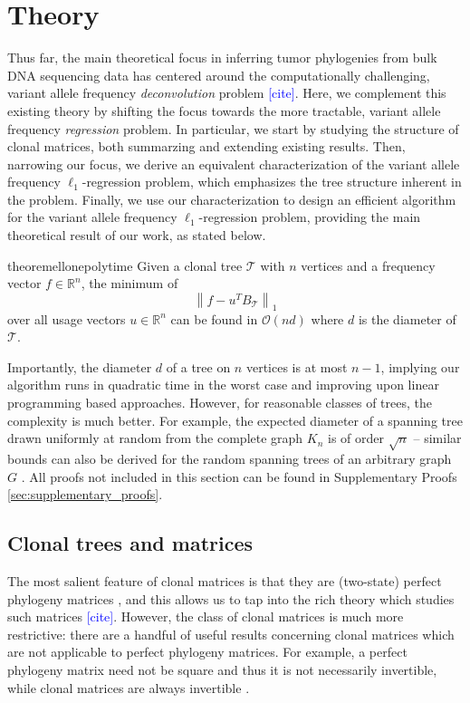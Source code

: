 \documentclass[10pt]{article}
\newcommand{\henri}[1]{\textcolor{blue}{[#1]}}
\newcommand{\tree}{\mathcal{T}}
\begin{document}
\section{Theory}
\label{sec:theory}
Thus far, the main theoretical focus in inferring tumor phylogenies from bulk DNA sequencing data 
has centered around the computationally challenging, variant allele frequency \emph{deconvolution} 
problem \henri{cite}. Here, we complement this existing theory by shifting the focus 
towards the more tractable, variant allele frequency \emph{regression} problem. In 
particular, we start by studying the structure of clonal matrices, both summarzing 
and extending existing results. Then, narrowing our focus, we derive an equivalent
characterization of the variant allele frequency $\ell_1$-regression problem, which 
emphasizes the tree structure inherent in the problem. Finally, we use our
characterization to design an efficient algorithm for the variant allele 
frequency $\ell_1$-regression problem, providing the main theoretical result of 
our work, as stated below. 
\begin{restatable}{theorem}{ellonepolytime}
    \label{thm:ellonepolytime}
    Given a clonal tree $\tree$ with $n$ vertices and a frequency vector $f \in \mathbb{R}^n$, the
    minimum of 
    \[\left\lVert f - u^T B_{\tree}\right\rVert_1 \]
    over all usage vectors $u \in \mathbb{R}^n$ can be found in $\mathcal{O}(nd)$ where $d$ is 
    the diameter of $\tree$.
\end{restatable}

Importantly, the diameter $d$ of a tree on $n$ vertices is at most $n - 1$, implying our algorithm 
runs in quadratic time in the worst case and improving upon linear programming based approaches. 
However, for reasonable classes of trees, the complexity is much better. For example, the expected
diameter of a spanning tree drawn uniformly at random from the complete graph $K_n$ is 
of order $\sqrt{n}$ -- similar bounds can also be derived 
for the random spanning trees of an arbitrary graph $G$ \cite{renyi_height_1967, chung_diameter_2012}.
All proofs not included in this section can be found in
Supplementary Proofs \ref{sec:supplementary_proofs}.


\subsection{Clonal trees and matrices}
\label{sec:clonal-trees-matrices}

The most salient feature of clonal matrices is that they are (two-state) perfect phylogeny matrices 
\cite{el-kebir_reconstruction_2015}, and this allows us to tap into the rich theory 
which studies such matrices \henri{cite}.
However, the class of clonal matrices is much more restrictive:
there are a handful of useful results concerning clonal matrices 
which are not applicable to perfect phylogeny matrices.
For example, a perfect phylogeny matrix need
not be square and thus it is not necessarily invertible, while clonal matrices are 
always invertible \cite{el-kebir_reconstruction_2015}. 
\end{document}
